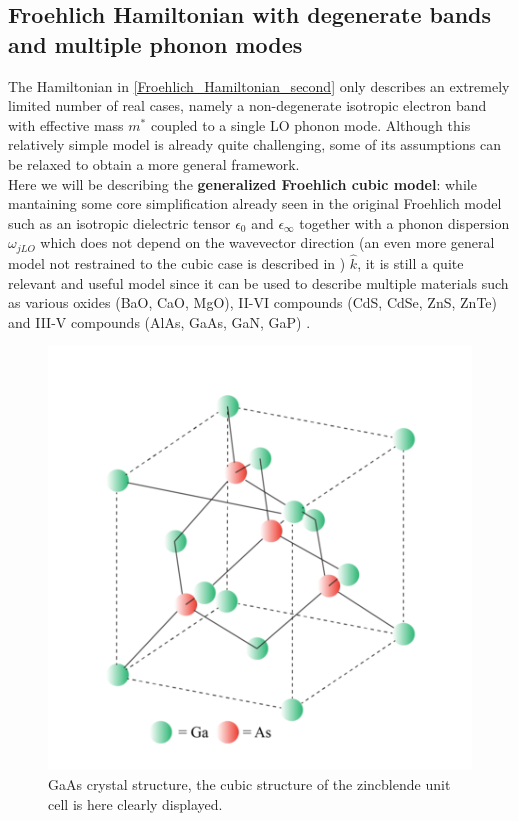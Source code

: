 \documentclass[12pt, a4paper]{report}
\numberwithin{equation}{section}
\begin{document}
\subsection{Froehlich Hamiltonian with degenerate bands and multiple phonon modes}
The Hamiltonian in \ref{Froehlich_Hamiltonian_second} only describes an extremely limited number of real cases, namely a non-degenerate 
isotropic electron band with effective mass $m^*$ coupled to a single LO phonon mode. Although this relatively simple model is already 
quite challenging, some of its assumptions can be relaxed to obtain a more general framework.\\
Here we will be describing the \textbf{generalized Froehlich cubic model}: while mantaining some core simplification already seen in the 
original Froehlich model such as an isotropic dielectric tensor $\epsilon_0$ and $\epsilon_\infty$ together with a phonon dispersion $\omega_{jLO}$ which 
does not depend on the wavevector direction (an even more general model not restrained to the cubic case is described in \cite{miglio2020predominance}) $\hat{k}$, it is still a quite relevant and useful model since 
it can be used to describe multiple materials such as various oxides (BaO, CaO, MgO), II-VI compounds (CdS, CdSe, ZnS, ZnTe) and 
III-V compounds (AlAs, GaAs, GaN, GaP) \cite{guster2021frohlich}.
\begin{figure}[H]
    \centering
    \includegraphics[scale=0.5]{GaAs_zincblende.png}
    \caption{GaAs crystal structure, the cubic structure of the zincblende unit cell is here clearly displayed.}
    \label{fig:GaAs_zincblende}
\end{figure}
\end{document}
